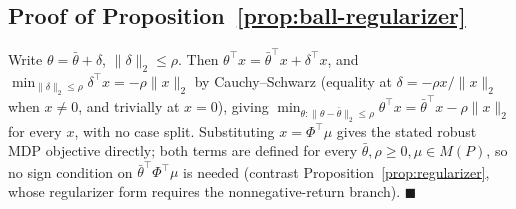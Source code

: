 \documentclass{article}
\begin{document}
\subsection{Proof of Proposition~\ref{prop:ball-regularizer}}
\label{app:proof-ball-regularizer}

Write $\theta=\bar\theta+\delta$, $\|\delta\|_2\le\rho$. Then
$\theta^\top x = \bar\theta^\top x + \delta^\top x$, and
$\min_{\|\delta\|_2\le\rho}\delta^\top x = -\rho\|x\|_2$ by Cauchy--Schwarz
(equality at $\delta=-\rho x/\|x\|_2$ when $x\neq0$, and trivially at $x=0$),
giving $\min_{\theta:\|\theta-\bar\theta\|_2\le\rho}\theta^\top x =
\bar\theta^\top x - \rho\|x\|_2$ for every $x$, with no case split. Substituting
$x=\Phi^\top\mu$ gives the stated robust MDP objective directly; both terms
are defined for every $\bar\theta,\rho\ge0,\mu\in M(P)$, so no sign condition
on $\bar\theta^\top\Phi^\top\mu$ is needed (contrast
Proposition~\ref{prop:regularizer}, whose regularizer form requires the
nonnegative-return branch). $\blacksquare$
\end{document}
